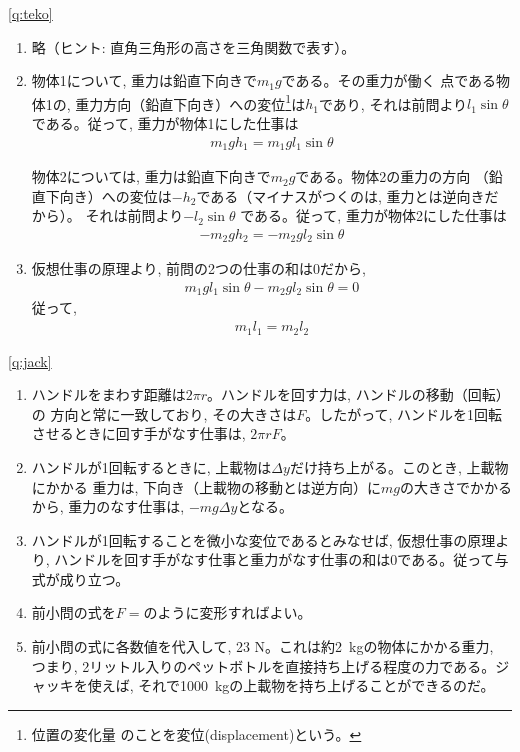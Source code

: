 % 
\ref{q:teko}
\begin{enumerate}
\item 略（ヒント: 直角三角形の高さを三角関数で表す）。
\item 物体1について, 重力は鉛直下向きで$m_1g$である。その重力が働く
点である物体1の, 重力方向（鉛直下向き）への変位\footnote{位置の変化量
のことを変位(displacement)という。}は$h_1$であり, それは前問より$l_1\sin\theta$
である。従って, 重力が物体1にした仕事は
\begin{eqnarray}m_1gh_1=m_1gl_1\sin\theta\end{eqnarray}

物体2については, 重力は鉛直下向きで$m_2g$である。物体2の重力の方向
（鉛直下向き）への変位は$-h_2$である（マイナスがつくのは, 重力とは逆向きだから）。
それは前問より$-l_2\sin\theta$
である。従って, 重力が物体2にした仕事は
\begin{eqnarray}-m_2gh_2=-m_2gl_2\sin\theta\end{eqnarray}
\item 仮想仕事の原理より, 前問の2つの仕事の和は0だから, 
\begin{eqnarray}m_1gl_1\sin\theta-m_2gl_2\sin\theta=0\end{eqnarray}
従って, 
\begin{eqnarray}m_1l_1=m_2l_2\end{eqnarray}
\end{enumerate}
\vspace{0.2cm}

%
\ref{q:jack}
\begin{enumerate}
\item ハンドルをまわす距離は$2\pi r$。ハンドルを回す力は, ハンドルの移動（回転）の
方向と常に一致しており, その大きさは$F$。したがって, ハンドルを1回転させるときに回す手がなす仕事は, 
$2\pi r F$。
\item ハンドルが1回転するときに, 上載物は$\Delta y$だけ持ち上がる。このとき, 上載物にかかる
重力は, 下向き（上載物の移動とは逆方向）に$mg$の大きさでかかるから, 重力のなす仕事は, 
$-mg\Delta y$となる。
\item ハンドルが1回転することを微小な変位であるとみなせば, 仮想仕事の原理より, 
ハンドルを回す手がなす仕事と重力がなす仕事の和は0である。従って与式が成り立つ。
\item 前小問の式を$F=$のように変形すればよい。
\item 前小問の式に各数値を代入して, 23 N。これは約2~kgの物体にかかる重力, つまり, 
2リットル入りのペットボトルを直接持ち上げる程度の力である。ジャッキを使えば, 
それで1000~kgの上載物を持ち上げることができるのだ。
\end{enumerate}


